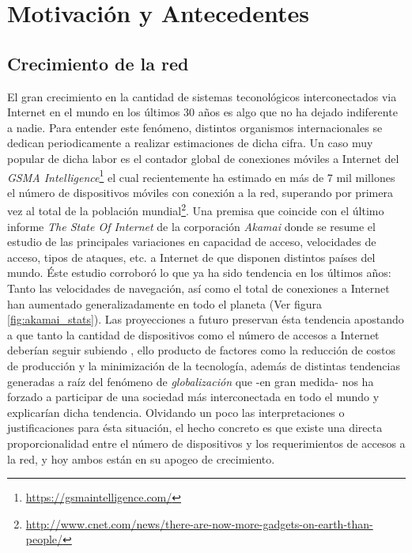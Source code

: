 \chapter{Motivación y Antecedentes}
\section{Crecimiento de la red}
El gran crecimiento en la cantidad de sistemas teconológicos interconectados via Internet en el mundo en los últimos 30 años es algo que no ha dejado indiferente a nadie. Para entender este fenómeno, distintos organismos internacionales se dedican periodicamente a realizar estimaciones de dicha cifra. Un caso muy popular de dicha labor es el contador global de conexiones móviles a Internet del \emph{GSMA Intelligence}\footnote{\url{https://gsmaintelligence.com/}} el cual recientemente ha estimado en más de 7 mil millones el número de dispositivos móviles con conexión a la red, superando por primera vez al total de la población mundial\footnote{\url{http://www.cnet.com/news/there-are-now-more-gadgets-on-earth-than-people/}}. Una premisa que coincide con el último informe \emph{The State Of Internet} de la corporación \emph{Akamai} \cite{report:akamai} donde se resume el estudio de las principales variaciones en capacidad de acceso, velocidades de acceso, tipos de ataques, etc. a Internet de que disponen distintos países del mundo. Éste estudio corroboró lo que ya ha sido tendencia en los últimos años: Tanto las velocidades de navegación, así como el total de conexiones a Internet han aumentado generalizadamente en todo el planeta (Ver figura \ref{fig:akamai_stats}). Las proyecciones a futuro preservan ésta tendencia apostando a que tanto la cantidad de dispositivos como el número de accesos a Internet deberían seguir subiendo \cite{nota:2020}, ello producto de factores como la reducción de costos de producción y la minimización de la tecnología, además de distintas tendencias generadas a raíz del fenómeno de \emph{globalización} que -en gran medida- nos ha forzado a participar de una sociedad más interconectada en todo el mundo y explicarían dicha tendencia. Olvidando un poco las interpretaciones o justificaciones para ésta situación, el hecho concreto es que existe una directa proporcionalidad entre el número de dispositivos y los requerimientos de accesos a la red, y hoy ambos están en su apogeo de crecimiento.

